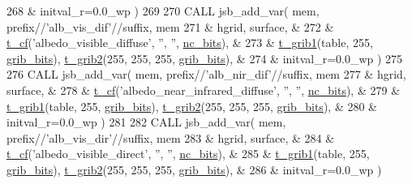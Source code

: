 \begin{DoxyCode}
268       & initval\_r=0.0\_wp )
269 
270     \textcolor{keyword}{CALL }jsb\_add\_var( mem, prefix//\textcolor{stringliteral}{'alb\_vis\_dif'}//suffix, mem%
271       & hgrid, surface,                                                      &
272       & \hyperlink{structmo__jsb__io_1_1t__cf}{t\_cf}(\textcolor{stringliteral}{'albedo\_visible\_diffuse'}, \textcolor{stringliteral}{''}, \textcolor{stringliteral}{''}, \hyperlink{namespacemo__jsb__io_a4bf2b656fa0a7acf938f0bfcad5870e3}{nc\_bits}),                        &
273       & \hyperlink{structmo__jsb__io_1_1t__grib1}{t\_grib1}(table, 255, \hyperlink{namespacemo__jsb__io_aade09fd070010f905e77497f041ce6c3}{grib\_bits}), \hyperlink{structmo__jsb__io_1_1t__grib2}{t\_grib2}(255, 255, 255, 
      \hyperlink{namespacemo__jsb__io_aade09fd070010f905e77497f041ce6c3}{grib\_bits}),   &
274       & initval\_r=0.0\_wp )
275 
276     \textcolor{keyword}{CALL }jsb\_add\_var( mem, prefix//\textcolor{stringliteral}{'alb\_nir\_dif'}//suffix, mem%
277       & hgrid, surface,                                                      &
278       & \hyperlink{structmo__jsb__io_1_1t__cf}{t\_cf}(\textcolor{stringliteral}{'albedo\_near\_infrared\_diffuse'}, \textcolor{stringliteral}{''}, \textcolor{stringliteral}{''}, \hyperlink{namespacemo__jsb__io_a4bf2b656fa0a7acf938f0bfcad5870e3}{nc\_bits}),                  &
279       & \hyperlink{structmo__jsb__io_1_1t__grib1}{t\_grib1}(table, 255, \hyperlink{namespacemo__jsb__io_aade09fd070010f905e77497f041ce6c3}{grib\_bits}), \hyperlink{structmo__jsb__io_1_1t__grib2}{t\_grib2}(255, 255, 255, 
      \hyperlink{namespacemo__jsb__io_aade09fd070010f905e77497f041ce6c3}{grib\_bits}),   &
280       & initval\_r=0.0\_wp )
281 
282     \textcolor{keyword}{CALL }jsb\_add\_var( mem, prefix//\textcolor{stringliteral}{'alb\_vis\_dir'}//suffix, mem%
283       & hgrid, surface,                                                      &
284       & \hyperlink{structmo__jsb__io_1_1t__cf}{t\_cf}(\textcolor{stringliteral}{'albedo\_visible\_direct'}, \textcolor{stringliteral}{''}, \textcolor{stringliteral}{''}, \hyperlink{namespacemo__jsb__io_a4bf2b656fa0a7acf938f0bfcad5870e3}{nc\_bits}),                         &
285       & \hyperlink{structmo__jsb__io_1_1t__grib1}{t\_grib1}(table, 255, \hyperlink{namespacemo__jsb__io_aade09fd070010f905e77497f041ce6c3}{grib\_bits}), \hyperlink{structmo__jsb__io_1_1t__grib2}{t\_grib2}(255, 255, 255, 
      \hyperlink{namespacemo__jsb__io_aade09fd070010f905e77497f041ce6c3}{grib\_bits}),   &
286       & initval\_r=0.0\_wp )

\end{DoxyCode}
